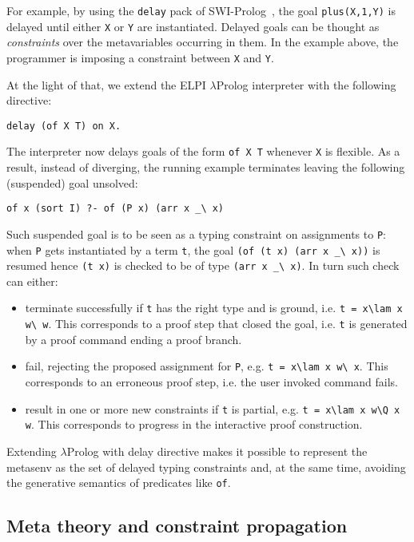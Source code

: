 \documentclass{easychair}
\begin{document}
For example, by using the \verb+delay+ pack of SWI-Prolog~\cite{SWI}, the goal
\verb+plus(X,1,Y)+ is delayed until either \verb+X+ or \verb+Y+ are
instantiated.  Delayed goals can be thought as \emph{constraints} over the
metavariables occurring in them. In the example above, the programmer is
imposing a constraint between \verb+X+ and \verb+Y+.

At the light of that, we extend the ELPI $\lambda$Prolog interpreter
with the following directive:

\begin{verbatim}
delay (of X T) on X.
\end{verbatim}

The interpreter now delays goals of the form \verb+of X T+ whenever \verb+X+
is flexible.  As a result, instead of diverging, the running example
terminates leaving the following (suspended) goal unsolved:

\begin{verbatim}
of x (sort I) ?- of (P x) (arr x _\ x)
\end{verbatim}

Such suspended goal is to be seen as a typing constraint on
assignments to \verb+P+: when \verb+P+ gets instantiated by a
term \verb+t+, the goal \verb+(of (t x) (arr x _\ x))+ is resumed
hence \verb+(t x)+ is checked to be of type \verb+(arr x _\ x)+.
In turn such check can either:
\begin{itemize}
\item terminate successfully if \verb+t+ has the right type and is ground,
	i.e. \verb+t = x\lam x w\ w+.  This corresponds to a proof step
	that closed the goal, i.e. \verb+t+ is generated by a
	proof command ending a proof branch.
\item fail, rejecting the proposed assignment for \verb+P+, e.g. 
	\verb+t = x\lam x w\ x+.  This corresponds to an erroneous proof step,
	i.e. the user invoked command fails.
\item result in one or more new constraints if \verb+t+ is partial,
	e.g. \verb+t = x\lam x w\Q x w+.  This corresponds to progress
	in the interactive proof construction.
\end{itemize}

Extending $\lambda$Prolog with delay directive makes it possible to represent
the metasenv as the set of delayed typing constraints and, at the same time,
avoiding the generative semantics of predicates like \verb+of+.

\subsection{Meta theory and constraint propagation} %
\end{document}

